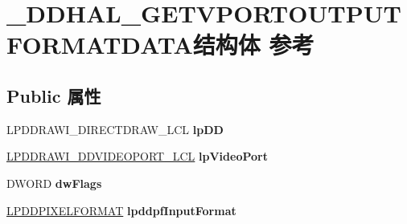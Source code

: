 \hypertarget{struct___d_d_h_a_l___g_e_t_v_p_o_r_t_o_u_t_p_u_t_f_o_r_m_a_t_d_a_t_a}{}\section{\+\_\+\+D\+D\+H\+A\+L\+\_\+\+G\+E\+T\+V\+P\+O\+R\+T\+O\+U\+T\+P\+U\+T\+F\+O\+R\+M\+A\+T\+D\+A\+T\+A结构体 参考}
\label{struct___d_d_h_a_l___g_e_t_v_p_o_r_t_o_u_t_p_u_t_f_o_r_m_a_t_d_a_t_a}
\subsection*{Public 属性}
\begin{DoxyCompactItemize}
\item 
\mbox{\label{struct___d_d_h_a_l___g_e_t_v_p_o_r_t_o_u_t_p_u_t_f_o_r_m_a_t_d_a_t_a_ac9885c1589fa208a851dbbdfb6ff7b76}} 
L\+P\+D\+D\+R\+A\+W\+I\+\_\+\+D\+I\+R\+E\+C\+T\+D\+R\+A\+W\+\_\+\+L\+CL {\bfseries lp\+DD}
\item 
\mbox{\label{struct___d_d_h_a_l___g_e_t_v_p_o_r_t_o_u_t_p_u_t_f_o_r_m_a_t_d_a_t_a_a4bc06b17104818ffedb20fb46f4915e6}} 
\hyperlink{struct___d_d_r_a_w_i___d_d_v_i_d_e_o_p_o_r_t___l_c_l}{L\+P\+D\+D\+R\+A\+W\+I\+\_\+\+D\+D\+V\+I\+D\+E\+O\+P\+O\+R\+T\+\_\+\+L\+CL} {\bfseries lp\+Video\+Port}
\item 
\mbox{\label{struct___d_d_h_a_l___g_e_t_v_p_o_r_t_o_u_t_p_u_t_f_o_r_m_a_t_d_a_t_a_a5b02f0a03a617956f537cac8ec8571c0}} 
D\+W\+O\+RD {\bfseries dw\+Flags}
\item 
\mbox{\label{struct___d_d_h_a_l___g_e_t_v_p_o_r_t_o_u_t_p_u_t_f_o_r_m_a_t_d_a_t_a_a0e3557b6e90e8317eeae5e2766365a6a}} 
\hyperlink{interfacevoid}{L\+P\+D\+D\+P\+I\+X\+E\+L\+F\+O\+R\+M\+AT} {\bfseries lpddpf\+Input\+Format}
\item 
\mbox{\label{struct___d_d_h_a_l___g_e_t_v_p_o_r_t_o_u_t_p_u_t_f_o_r_m_a_t_d_a_t_a_a3b2a6c040e98d94513018187301d9ffe}} 

\end{DoxyCompactItemize}

